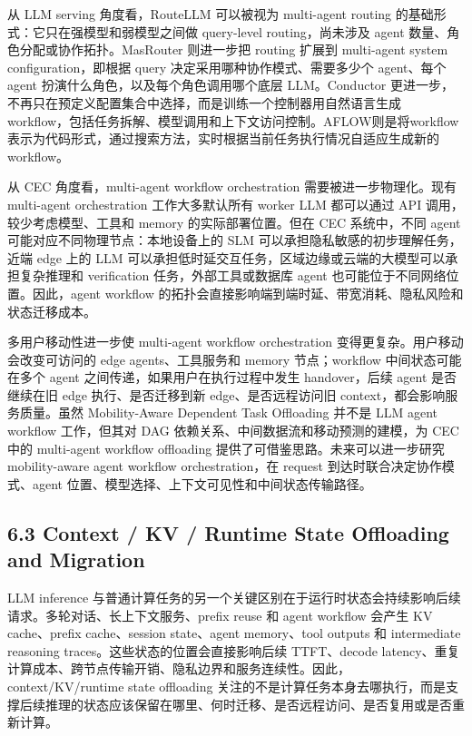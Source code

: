 \documentclass[a4paper,twocolumn,10pt]{ctexart}
\begin{document}
从 LLM serving 角度看，RouteLLM 可以被视为 multi-agent routing 的基础形式：它只在强模型和弱模型之间做 query-level routing，尚未涉及 agent 数量、角色分配或协作拓扑。MasRouter 则进一步把 routing 扩展到 multi-agent system configuration，即根据 query 决定采用哪种协作模式、需要多少个 agent、每个 agent 扮演什么角色，以及每个角色调用哪个底层 LLM。Conductor 更进一步，不再只在预定义配置集合中选择，而是训练一个控制器用自然语言生成 workflow，包括任务拆解、模型调用和上下文访问控制。AFLOW则是将workflow表示为代码形式，通过搜索方法，实时根据当前任务执行情况自适应生成新的workflow。


从 CEC 角度看，multi-agent workflow orchestration 需要被进一步物理化。现有 multi-agent orchestration 工作大多默认所有 worker LLM 都可以通过 API 调用，较少考虑模型、工具和 memory 的实际部署位置。但在 CEC 系统中，不同 agent 可能对应不同物理节点：本地设备上的 SLM 可以承担隐私敏感的初步理解任务，近端 edge 上的 LLM 可以承担低时延交互任务，区域边缘或云端的大模型可以承担复杂推理和 verification 任务，外部工具或数据库 agent 也可能位于不同网络位置。因此，agent workflow 的拓扑会直接影响端到端时延、带宽消耗、隐私风险和状态迁移成本。


多用户移动性进一步使 multi-agent workflow orchestration 变得更复杂。用户移动会改变可访问的 edge agents、工具服务和 memory 节点；workflow 中间状态可能在多个 agent 之间传递，如果用户在执行过程中发生 handover，后续 agent 是否继续在旧 edge 执行、是否迁移到新 edge、是否远程访问旧 context，都会影响服务质量。虽然 Mobility-Aware Dependent Task Offloading 并不是 LLM agent workflow 工作，但其对 DAG 依赖关系、中间数据流和移动预测的建模，为 CEC 中的 multi-agent workflow offloading 提供了可借鉴思路。未来可以进一步研究 mobility-aware agent workflow orchestration，在 request 到达时联合决定协作模式、agent 位置、模型选择、上下文可见性和中间状态传输路径。




\subsection{6.3 Context / KV / Runtime State Offloading and Migration}

LLM inference 与普通计算任务的另一个关键区别在于运行时状态会持续影响后续请求。多轮对话、长上下文服务、prefix reuse 和 agent workflow 会产生 KV cache、prefix cache、session state、agent memory、tool outputs 和 intermediate reasoning traces。这些状态的位置会直接影响后续 TTFT、decode latency、重复计算成本、跨节点传输开销、隐私边界和服务连续性。因此，context/KV/runtime state offloading 关注的不是计算任务本身去哪执行，而是支撑后续推理的状态应该保留在哪里、何时迁移、是否远程访问、是否复用或是否重新计算。
\end{document}
